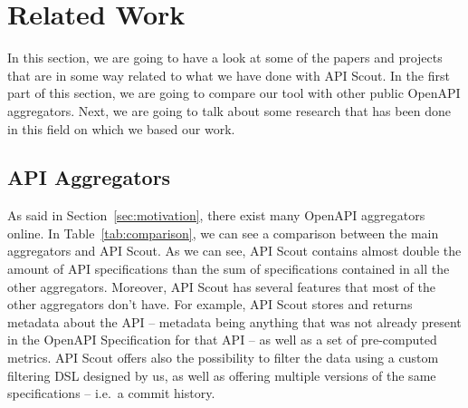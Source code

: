\section{Related Work}\label{sec:related-work}
In this section, we are going to have a look at some of the papers and projects that are in some way related to what we have done with API Scout.
In the first part of this section, we are going to compare our tool with other public OpenAPI aggregators.
Next, we are going to talk about some research that has been done in this field on which we based our work.

\subsection{API Aggregators}\label{subsec:api-aggregators}
As said in Section~\ref{sec:motivation}, there exist many OpenAPI aggregators online.
In Table~\ref{tab:comparison}, we can see a comparison between the main aggregators and API Scout.
As we can see, API Scout contains almost double the amount of API specifications than the sum of specifications contained in all the other aggregators.
Moreover, API Scout has several features that most of the other aggregators don't have.
For example, API Scout stores and returns metadata about the API -- metadata being anything that was not already present in the OpenAPI Specification for that API -- as well as a set of pre-computed metrics.
API Scout offers also the possibility to filter the data using a custom filtering DSL designed by us, as well as offering multiple versions of the same specifications -- i.e.\ a commit history.

